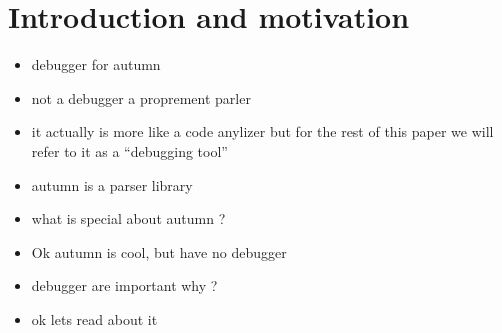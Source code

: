 \chapter{Introduction and motivation}


	\begin{itemize}
		\item debugger for autumn
		\item not a debugger a proprement parler
		\item it actually is more like a code anylizer but for the rest of this paper we will refer to it as a ``debugging tool''
		\item autumn is a parser library
		\item what is special about autumn ?
		\item Ok autumn is cool, but have no debugger
		\item debugger are important why ?
		\item ok lets read about it
	\end{itemize}


